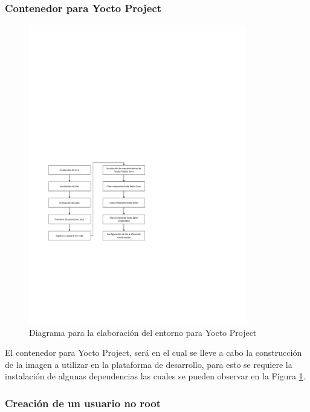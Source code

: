 \subsubsection{Contenedor para Yocto Project}\label{subsec:generacion_entorno_yocto}

\begin{figure}[h!] 
    \centering
    \includegraphics[width=0.85\textwidth]{fig/especifico_2/diagrama_de_entorno_yocto_project.pdf}
    \caption{Diagrama para la elaboración del entorno para Yocto Project}
    \label{fig:yocto_enviroment_diagram_figure}
\end{figure}

El contenedor para Yocto Project, será en el cual se lleve a cabo la construcción de la imagen a utilizar en la plataforma de desarrollo, para esto se requiere la instalación de algunas dependencias las cuales se pueden observar en la Figura \ref{fig:yocto_enviroment_diagram_figure}.



\subsubsection{Creación de un usuario no root}


